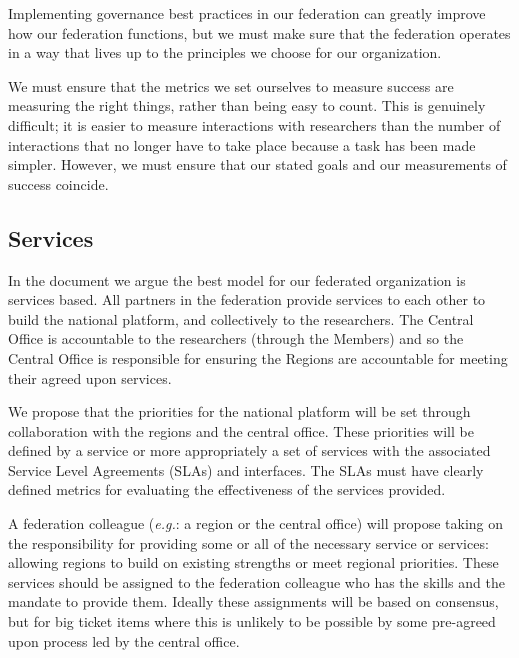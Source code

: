 \documentclass[11pt, letterpaper, twoside]{article}
\begin{document}
Implementing governance best practices in our federation can greatly
improve how our federation functions, but we must make sure that the
federation operates in a way that lives up to the principles we choose
for our organization.


We must ensure that the metrics we set ourselves to measure success are
measuring the right things, rather than being easy to count.  This is
genuinely difficult; it is easier to measure interactions with
researchers than the number of interactions that no longer have to take
place because a task has been made simpler.  However, we must ensure that
our stated goals and our measurements of success coincide.

\subsection*{Services}
%

In the document we argue the best model for our federated organization
is services based. All partners in the federation provide services to
each other to build the national platform, and collectively to the
researchers. The Central Office is accountable to the researchers
(through the Members) and so the Central Office is responsible for
ensuring the Regions are accountable for meeting their agreed upon
services.

We propose that the priorities for the national platform will be set
through collaboration with the regions and the central office. These
priorities will be defined by a service or more appropriately a set of
services with the associated Service Level Agreements (SLAs) and
interfaces. The SLAs must have clearly defined metrics for evaluating
the effectiveness of the services provided.


A federation colleague (\textit{e.g.}: a region or the central office) will 
propose taking on the responsibility for providing some or all of the
necessary service or services: allowing regions to build on existing
strengths or meet regional priorities. These services should be assigned
to the federation colleague who has the skills and the mandate to
provide them. Ideally these assignments will be based on consensus, but
for big ticket items where this is unlikely to be possible by some
pre-agreed upon process led by the central office.
\end{document}
